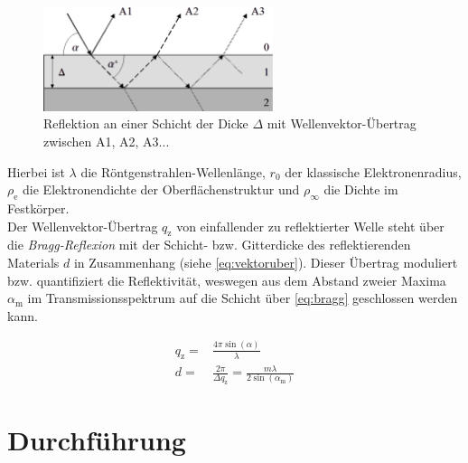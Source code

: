 \documentclass[numbers=noenddot,a4paper,notitlepage,twoside,BCOR15mm]{scrartcl}
\newcommand{\ix}[1]{_\text{#1}}
\newcommand{\tilt}[1]{\textit{#1}}
\begin{document}
				\begin{figure}[h]
					\centering
					\includegraphics[width=0.6\textwidth]{rontgenreflekt.png}
					\caption{Reflektion an einer Schicht der Dicke $\Delta$ mit Wellenvektor-Übertrag zwischen A1, A2, A3... \cite{USiegenMIE}}
				\end{figure}

			Hierbei ist $\lambda$ die Röntgenstrahlen-Wellenlänge, $r\ix{0}$ der klassische Elektronenradius, $\rho\ix{e}$ die Elektronendichte der Oberflächenstruktur und $\rho\ix{$\infty$}$ die Dichte im Festkörper.\\
			Der Wellenvektor-Übertrag $q\ix{z}$ von einfallender zu reflektierter Welle steht über die \tilt{Bragg-Reflexion} mit der Schicht- bzw. Gitterdicke des reflektierenden Materials $d$ in Zusammenhang (siehe \autoref{eq:vektoruber}). Dieser Übertrag moduliert bzw. quantifiziert die Reflektivität, weswegen aus dem Abstand zweier Maxima $\alpha\ix{m}$ im Transmissionsspektrum auf die Schicht über \autoref{eq:bragg} geschlossen werden kann.

				\begin{align}
					q\ix{z}=&\frac{4\pi\sin\left(\alpha\right)}{\lambda} \label{eq:vektoruber} \\
					d=&\frac{2\pi}{\Delta q\ix{z}}=\frac{m\lambda}{2\sin\left(\alpha\ix{m}\right)} \label{eq:bragg}
				\end{align}

	\newpage
	\section{Durchführung}
\end{document}
